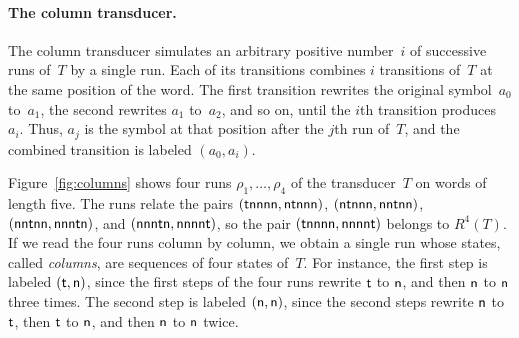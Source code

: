 \paragraph{The column transducer.}
The column transducer simulates an arbitrary positive number~$i$ of successive
runs of~$T$ by a single run. Each of its transitions combines $i$ transitions
of~$T$ at the same position of the word. The first transition rewrites the
original symbol~$a_0$ to~$a_1$, the second rewrites $a_1$ to~$a_2$, and so on,
until the $i$th transition produces~$a_i$. Thus, $a_j$ is the symbol at that
position after the $j$th run of~$T$, and the combined transition is labeled
$(a_0,a_i)$.

Figure~\ref{fig:columns} shows four runs $\rho_1, \ldots, \rho_4$ of the
transducer~$T$ on words of length five. The runs relate the pairs
$(\mathsf{t}\mathsf{n}\mathsf{n}\mathsf{n}\mathsf{n}, \mathsf{n}\mathsf{t}\mathsf{n}\mathsf{n}\mathsf{n})$,
$(\mathsf{n}\mathsf{t}\mathsf{n}\mathsf{n}\mathsf{n}, \mathsf{n}\mathsf{n}\mathsf{t}\mathsf{n}\mathsf{n})$,
$(\mathsf{n}\mathsf{n}\mathsf{t}\mathsf{n}\mathsf{n}, \mathsf{n}\mathsf{n}\mathsf{n}\mathsf{t}\mathsf{n})$, and
$(\mathsf{n}\mathsf{n}\mathsf{n}\mathsf{t}\mathsf{n}, \mathsf{n}\mathsf{n}\mathsf{n}\mathsf{n}\mathsf{t})$, so the pair
$(\mathsf{t}\mathsf{n}\mathsf{n}\mathsf{n}\mathsf{n}, \mathsf{n}\mathsf{n}\mathsf{n}\mathsf{n}\mathsf{t})$ belongs to
$R^4(T)$. If we read the four runs column by column, we obtain a single run
whose states, called \emph{columns}, are sequences of four states of~$T$.
For instance, the first step is labeled $(\mathsf{t},\mathsf{n})$, since the first steps
of the four runs rewrite $\mathsf{t}$ to $\mathsf{n}$, and then $\mathsf{n}$ to $\mathsf{n}$
three times. The second step is labeled $(\mathsf{n},\mathsf{n})$, since the second
steps rewrite $\mathsf{n}$ to $\mathsf{t}$, then $\mathsf{t}$ to $\mathsf{n}$, and then $\mathsf{n}$ to
$\mathsf{n}$ twice.


